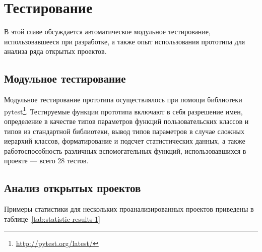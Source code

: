 \chapter{Тестирование}

В этой главе обсуждается автоматическое модульное тестирование, использовавшееся
при разработке, а также опыт использования прототипа для анализа ряда открытых
проектов.

\section{Модульное тестирование}
\label{sec:unit-testing}
Модульное тестирование прототипа осуществлялось при помощи библиотеки
pytest\footnote{\url{http://pytest.org/latest/}}.
Тестируемые функции прототипа включают в себя разрешение имен, определение в
качестве типов параметров функций пользовательских классов и типов из
стандартной библиотеки, вывод типов параметров в случае сложных иерархий
классов, форматирование и подсчет статистических данных, а также
работоспособность различных вспомогательных функций, использовавшихся в проекте
--- всего 28 тестов. 

\section{Анализ открытых проектов}
\label{sec:projects-analysis}

Примеры статистики для нескольких проанализированных проектов приведены в
таблице~\ref{tab:statistic-results-1}

